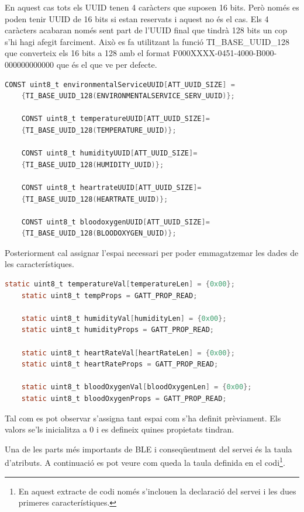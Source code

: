 En aquest cas tots els UUID tenen 4 caràcters que suposen 16 bits. Però només es poden tenir UUID de 16 bits si estan reservats i aquest no és el cas.
Els 4 caràcters acabaran només sent part de l'UUID final que tindrà 128 bits un cop s'hi hagi afegit farciment.
Això es fa utilitzant la funció TI\_BASE\_UUID\_128 que converteix els 16 bits a 128 amb el format F000XXXX-0451-4000-B000-000000000000 que és el que ve per defecte.

\begin{lstlisting}[language=C]
	CONST uint8_t environmentalServiceUUID[ATT_UUID_SIZE] =
	{TI_BASE_UUID_128(ENVIRONMENTALSERVICE_SERV_UUID)};
	
	CONST uint8_t temperatureUUID[ATT_UUID_SIZE]=
	{TI_BASE_UUID_128(TEMPERATURE_UUID)};
	
	CONST uint8_t humidityUUID[ATT_UUID_SIZE]=
	{TI_BASE_UUID_128(HUMIDITY_UUID)};
	
	CONST uint8_t heartrateUUID[ATT_UUID_SIZE]=
	{TI_BASE_UUID_128(HEARTRATE_UUID)};
	
	CONST uint8_t bloodoxygenUUID[ATT_UUID_SIZE]=
	{TI_BASE_UUID_128(BLOODOXYGEN_UUID)};
\end{lstlisting}

Posteriorment cal assignar l'espai necessari per poder emmagatzemar les dades de les característiques.

\begin{lstlisting}[language=C]
	static uint8_t temperatureVal[temperatureLen] = {0x00};
	static uint8_t tempProps = GATT_PROP_READ;
	
	static uint8_t humidityVal[humidityLen] = {0x00};
	static uint8_t humidityProps = GATT_PROP_READ;
	
	static uint8_t heartRateVal[heartRateLen] = {0x00};
	static uint8_t heartRateProps = GATT_PROP_READ;
	
	static uint8_t bloodOxygenVal[bloodOxygenLen] = {0x00};
	static uint8_t bloodOxygenProps = GATT_PROP_READ;
\end{lstlisting}

Tal com es pot observar s'assigna tant espai com s'ha definit prèviament.
Els valors se'ls inicialitza a 0 i es defineix quines propietats tindran.

Una de les parts més importants de BLE i conseqüentment del servei és la taula d'atributs.
A continuació es pot veure com queda la taula definida en el codi\footnote{En aquest extracte de codi només s'inclouen la declaració del servei i les dues primeres característiques.}.

